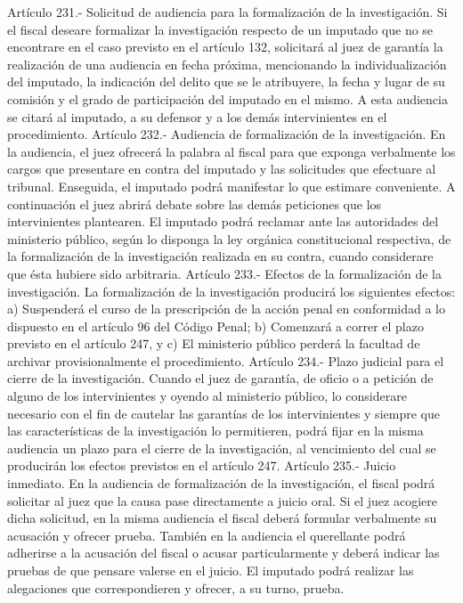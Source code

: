     Artículo 231.- Solicitud de audiencia para la formalización de la investigación. Si el fiscal deseare formalizar la investigación respecto de un imputado que no se encontrare en el caso previsto en el artículo 132, solicitará al juez de garantía la realización de una audiencia en fecha próxima, mencionando la individualización del imputado, la indicación del delito que se le atribuyere, la fecha y lugar de su comisión y el grado de participación del imputado en el mismo.
    A esta audiencia se citará al imputado, a su defensor y a los demás intervinientes en el procedimiento.
    Artículo 232.- Audiencia de formalización de la investigación. En la audiencia, el juez ofrecerá la palabra al fiscal para que exponga verbalmente los cargos que presentare en contra del imputado y las solicitudes que efectuare al tribunal. Enseguida, el imputado podrá manifestar lo que estimare conveniente.
    A continuación el juez abrirá debate sobre las demás peticiones que los intervinientes plantearen.
    El imputado podrá reclamar ante las autoridades del ministerio público, según lo disponga la ley orgánica constitucional respectiva, de la formalización de la investigación realizada en su contra, cuando considerare que ésta hubiere sido arbitraria.
    Artículo 233.- Efectos de la formalización de la investigación. La formalización de la investigación producirá los siguientes efectos:
    a) Suspenderá el curso de la prescripción de la acción penal en conformidad a lo dispuesto en el artículo 96 del Código Penal;
    b) Comenzará a correr el plazo previsto en el artículo 247, y
    c) El ministerio público perderá la facultad de archivar provisionalmente el procedimiento.
    Artículo 234.- Plazo judicial para el cierre de la investigación. Cuando el juez de garantía, de oficio o a petición de alguno de los intervinientes y oyendo al ministerio público, lo considerare necesario con el fin de cautelar las garantías de los intervinientes y siempre que las características de la investigación lo permitieren, podrá fijar en la misma audiencia un plazo para el cierre de la investigación, al vencimiento del cual se producirán los efectos previstos en el artículo 247.
    Artículo 235.- Juicio inmediato. En la audiencia de formalización de la investigación, el fiscal podrá solicitar al juez que la causa pase directamente a juicio oral. Si el juez acogiere dicha solicitud, en la misma audiencia el fiscal deberá formular verbalmente su acusación y ofrecer prueba. También en la audiencia el querellante podrá adherirse a la acusación del fiscal o acusar particularmente y deberá indicar las pruebas de que pensare valerse en el juicio. El imputado podrá realizar las alegaciones que correspondieren y ofrecer, a su turno, prueba.
